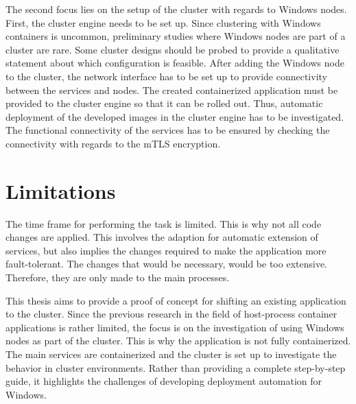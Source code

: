 The second focus lies on the setup of the cluster with regards to \ac{Windows} nodes.
First, the cluster engine needs to be set up. Since clustering with \ac{Windows} containers is uncommon, preliminary studies where \ac{Windows} nodes are part of a cluster are rare. Some cluster designs should be probed to provide a qualitative statement about which configuration is feasible.
After adding the \ac{Windows} node to the cluster, the network interface has to be set up to provide connectivity between the services and nodes. 
The created containerized application must be provided to the cluster engine so that it can be rolled out. Thus, automatic deployment of the developed images in the cluster engine has to be investigated. 
The functional connectivity of the services has to be ensured by checking the connectivity with regards to the \ac{mTLS} encryption.


\section{Limitations}
The time frame for performing the task is limited. This is why not all code changes are applied. This involves the adaption for automatic extension of services, but also implies the changes required to make the application more fault-tolerant. The changes that would be necessary, would be too extensive. Therefore, they are only made to the main processes.

This thesis aims to provide a proof of concept for shifting an existing application to the cluster. Since the previous research in the field of host-process container applications is rather limited, the focus is on the investigation of using \ac{Windows} nodes as part of the cluster.
This is why the application is not fully containerized. The main services are containerized and the cluster is set up to investigate the behavior in cluster environments. 
Rather than providing a complete step-by-step guide, it highlights the challenges of developing deployment automation for \ac{Windows}.
